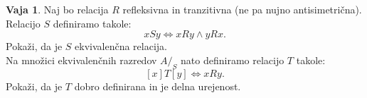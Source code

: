 \documentclass{article}
\theoremstyle{definition}
\newtheorem{vaja}{Vaja}
\begin{document}
\begin{vaja}
  Naj bo relacija $R$ refleksivna in tranzitivna (ne pa nujno antisimetrična). Relacijo $S$ definiramo takole:
  \[x S y \iff x R y \land y R x.\]
  Pokaži, da je $S$ ekvivalenčna relacija.\\
  Na množici ekvivalenčnih razredov $A/_S$ nato definiramo relacijo $T$ takole:
  \[[x] T [y] \iff x R y.\]
  Pokaži, da je $T$ dobro definirana in je delna urejenost.
\end{vaja}
\end{document}
